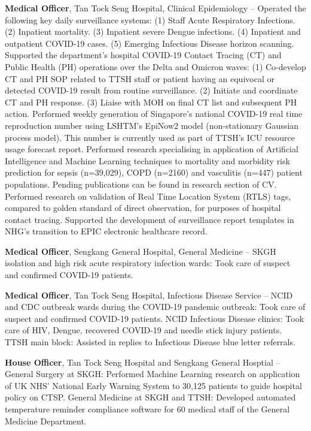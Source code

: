 \documentclass[letterpaper,10pt,oneside]{article}
\begin{document}
\begin{body}
{\textbf{Medical Officer}, Tan Tock Seng Hospital, Clinical Epidemiology}
\hfill
{} --
\BulletItem
Operated the following key daily surveillance systems: (1) Staff Acute Respiratory Infections. (2) Inpatient mortality. (3) Inpatient severe Dengue infections. (4) Inpatient and outpatient COVID-19 cases. (5) Emerging Infectious Disease horizon scanning.
\BulletItem
Supported the department's hospital COVID-19 Contact Tracing (CT) and Public Health (PH) operations over the Delta and Omicron waves: (1) Co-develop CT and PH SOP related to TTSH staff or patient having an equivocal or detected COVID-19 result from routine surveillance. (2) Initiate and coordinate CT and PH response. (3) Liaise with MOH on final CT list and subsequent PH action.
\BulletItem
Performed weekly generation of Singapore's national COVID-19 real time reproduction number using LSHTM's EpiNow2 model (non-stationary Gaussian process model). This number is currently used as part of TTSH's ICU resource usage forecast report.
\BulletItem
Performed research specialising in application of Artificial Intelligence and Machine Learning techniques to mortality and morbidity risk prediction for sepsis (n=39,029), COPD (n=2160) and vasculitis (n=447) patient populations. Pending publications can be found in research section of CV.
\BulletItem
Performed research on validation of Real Time Location System (RTLS) tags, compared to golden standard of direct observation, for purposes of hospital contact tracing.
\BulletItem
Supported the development of surveillance report templates in NHG's transition to EPIC electronic healthcare record.

\BigGap
{\textbf{Medical Officer}, Sengkang General Hospital, General Medicine}
\hfill
{} --
\BulletItem
SKGH isolation and high risk acute respiratory infection wards: Took care of suspect and confirmed COVID-19 patients.

\BigGap
{\textbf{Medical Officer}, Tan Tock Seng Hospital, Infectious Disease Service}
\hfill
{} --
\BulletItem
NCID and CDC outbreak wards during the COVID-19 pandemic outbreak: Took care of suspect and confirmed COVID-19 patients.
\BulletItem
NCID Infectious Disease clinics: Took care of HIV, Dengue, recovered COVID-19 and needle stick injury patients.
\BulletItem
TTSH main block: Assisted in replies to Infectious Disease blue letter referrals.  

\BigGap
{\textbf{House Officer}, Tan Tock Seng Hospital and Sengkang General Hosptial}
\hfill
{} --
\BulletItem
General Surgery at SKGH: Performed Machine Learning research on application of UK NHS' National Early Warning System to 30,125 patients to guide hospital policy on CTSP.
\BulletItem
General Medicine at SKGH and TTSH: Developed automated temperature reminder compliance software for 60 medical staff of the General Medicine Department.


\end{body}
\end{document}
